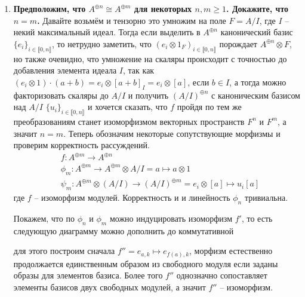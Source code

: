 \documentclass{article}
\begin{document}
\begin{enumerate}
        \begin{enumerate}
            \item \textbf{Предположим, что $A^{\oplus n}\cong A^{\oplus m}$ для некоторых $n,m\geq1$. Докажите, что $n=m$.}
                Давайте возьмём и тензорно это умножим на поле $F=A/I$, где $I$ – некий максимальный идеал. Тогда если выделить
                в $A^{\oplus n}$ канонический базис $\{e_i\}_{i\in\lBrack0,n\rBrack}$, то нетрудно заметить, что $(e_i\otimes 1_F)_
                {i\in\lBrack0,n\rBrack}$ порождает $A^{\oplus n}\otimes F$, но также очевидно, что умножение на скаляры происходит
                с точностью до добавления элемента идеала $I$, так как $(e_i\otimes 1)\cdot(a+b)=e_i\otimes [a+b]_I=
                e_i\otimes [a]$, если $b\in I$, а тогда можно факторизовать скаляры до $A/I$ и получить
                $(A/I)^{\oplus n}$ с каноническим базисом над $A/I$ $\{u_i\}_{i\in\lBrack0,n\rBrack}$ и хочется сказать, что $f$ пройдя по тем же преобразованиям
                станет изоморфизмом векторных пространств $F^n$ и $F^m$, а значит $n=m$. Теперь обозначим некоторые
                сопутствующие морфизмы и проверим корректность рассуждений.
                \begin{align*}
                    &f:A^{\oplus m}\longrightarrow A^{\oplus n}\\
                    &\phi_m:A^{\oplus m}\longrightarrow A^{\oplus m}\otimes A/I=a\mapsto a\otimes 1\\
                    &\psi_m:A^{\oplus m}\otimes (A/I)\longrightarrow (A/I)^{\oplus m}=e_i\otimes[a]\mapsto u_i[a]
                \end{align*}
                где $f$ – изоморфизм модулей. Корректность и и линейность $\phi_n$ тривиальна.


                Покажем, что по $\phi_n$ и $\phi_m$ можно индуцировать изоморфизм $f'$,
                то есть следующую диаграмму можно дополнить до коммутативной
                \begin{center}
                \end{center}
                для этого построим сначала $f'' = e_{a,k}\mapsto e_{f(a),k}$, морфизм естественно продолжается
                единственным образом из свободного модуля если заданы образы для элементов базиса. Более того $f''$
                однозначно сопоставляет элементы базисов двух свободных модулей, а значит $f''$ – изоморфизм.
                

\end{enumerate}
\end{enumerate}
\end{document}
